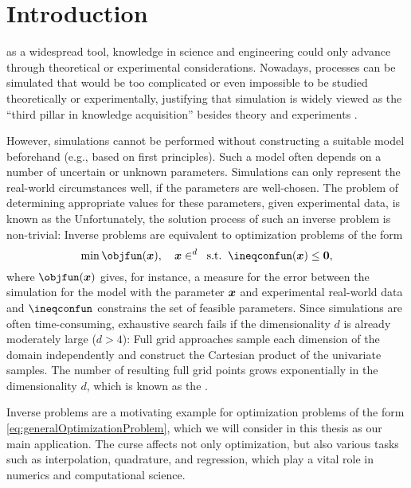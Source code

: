 
\chapter{Introduction}
\label{chap:10introduction}

as a widespread tool,
knowledge in science and engineering could only advance through
theoretical or experimental considerations.
Nowadays, processes can be simulated
that would be too complicated or even impossible
to be studied theoretically or experimentally,
justifying that simulation is widely viewed as the
``third pillar in knowledge acquisition''
besides theory and experiments \cite{Bungartz14Modeling}.

However, simulations cannot be performed without constructing
a suitable model beforehand (e.g., based on first principles).
Such a model often depends on a number of uncertain or unknown parameters.
Simulations can only represent the real-world circumstances well,
if the parameters are well-chosen.
The problem of determining appropriate values for these parameters,
given experimental data, is known as the 
Unfortunately, the solution process of such an inverse problem is non-trivial:
Inverse problems are equivalent to optimization problems of the form
\begin{equation}
  \label{eq:generalOptimizationProblem}
  \min \objfun(\*x),\quad
  \*x \in \real^d\;\;\text{s.t.}\;\;
  \ineqconfun(\*x) \le \*0,
\end{equation}
where $\objfun(\*x)$ gives, for instance,
a measure for the error between the simulation for the model with
the parameter ${\boldsymbol{x}}$ and experimental real-world data and
$\ineqconfun$ constrains the set of feasible parameters.
Since simulations are often time-consuming,
exhaustive search fails
if the dimensionality $d$ is already moderately large ($d > 4$):
Full grid approaches sample each dimension of the domain
independently and construct the Cartesian product of the univariate
samples.
The number of resulting full grid points
grows exponentially in the dimensionality $d$,
which is known as the  \cite{Bellman61Adaptive}.

Inverse problems are a motivating example for optimization problems
of the form \eqref{eq:generalOptimizationProblem}, which we will consider in
this thesis as our main application.
The curse affects not only optimization,
but also various tasks such as interpolation, quadrature, and regression,
which play a vital role in numerics and computational science.

